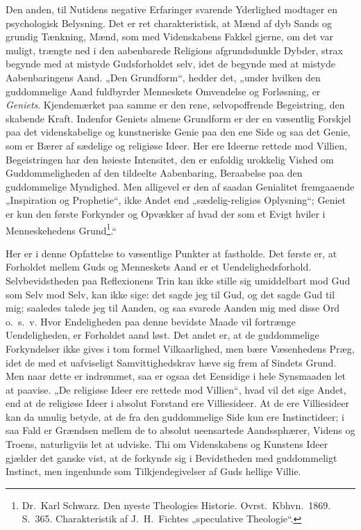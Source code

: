\documentclass[12pt]{book}
\begin{document}
Den anden, til Nutidens negative Erfaringer svarende Yderlighed
modtager en psychologisk Belysning. Det er ret charakteristisk, at
Mænd af dyb Sands og grundig Tænkning, Mænd, som med Videnskabens
Fakkel gjerne, om det var muligt, trængte ned i den aabenbarede
Religions afgrundsdunkle Dybder, strax begynde med at mistyde
Gudsforholdet selv, idet de begynde med at mistyde Aabenbaringens
Aand. „Den Grundform“, hedder det, „under hvilken den guddommelige
Aand fuldbyrder Menneskets Omvendelse og Forløsning, er
\emph{Geniets}. Kjendemærket paa samme er den rene, selvopoffrende
Begeistring, den skabende Kraft. Indenfor Geniets almene Grundform
er der en væsentlig Forskjel paa det videnskabelige og kunstneriske
Genie paa den ene Side og saa det Genie, som er Bærer af sædelige og
religiøse Ideer. Her ere Ideerne rettede mod Villien, Begeistringen
har den høieste Intensitet, den er enfoldig urokkelig Vished om
Guddommeligheden af den tildeelte Aabenbaring, Beraabelse paa den
guddommelige Myndighed. Men alligevel er den af saadan Genialitet
fremgaaende „Inspiration og Prophetie“, ikke Andet end
„sædelig-religiøs Oplysning“; Geniet er kun den første Forkynder og
Opvækker af hvad der som et Evigt hviler i Menneskehedens
Grund\footnote{Dr.\ Karl Schwarz. Den nyeste Theologies Historie.
Ovrst.\ Kbhvn.\ 1869. S.\ 365. Charakteristik af J.\ H.\ Fichtes
„speculative Theologie“.}.“

Her er i denne Opfattelse to væsentlige Punkter at fastholde. Det
første er, at Forholdet mellem Guds og Menneskets Aand er et
Uendelighedsforhold. Selvbevidstheden paa Reflexionens Trin kan ikke
stille sig umiddelbart mod Gud som Selv mod Selv, kan ikke sige: det
sagde jeg til Gud, og det sagde Gud til mig; saaledes talede jeg til
Aanden, og saa svarede Aanden mig med disse Ord o.\ s.\ v. Hvor
Endeligheden paa denne bevidste Maade vil fortrænge Uendeligheden,
er Forholdet aand\-
løst. Det andet er, at de guddommelige Forkyndelser ikke gives i tom
formel Vilkaarlighed, men bære Væsenhedens Præg, idet de med et
uafviseligt Samvittighedskrav hæve sig frem af Sindets Grund. Men
naar dette er indrømmet, saa er ogsaa det Eensidige i hele
Synsmaaden let at paavise. „De religiøse Ideer ere rettede mod
Villien“, hvad vil det sige Andet, end at de religiøse Ideer i
absolut Forstand ere Villiesideer. At de ere Villiesideer kan da
umulig betyde, at de fra den guddommelige Side kun ere
Instinctideer; i saa Fald er Grændsen mellem de to absolut
ueensartede Aandssphærer, Videns og Troens, naturligviis let at
udviske. Thi om Videnskabens og Kunstens Ideer gjælder det ganske
vist, at de forkynde sig i Bevidstheden med guddommeligt Instinct,
men ingenlunde som Tilkjendegivelser af Guds hellige Villie.
\end{document}
